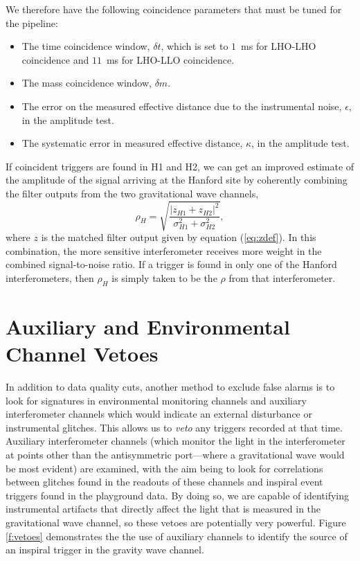We therefore have the following coincidence parameters that must be tuned for
the pipeline:
\begin{itemize}
\item The time coincidence window, $\delta t$, which is set to $1$~ms for
LHO-LHO coincidence and $11$~ms for LHO-LLO coincidence.

\item The mass coincidence window, $\delta m$.

\item The error on the measured effective distance due to the instrumental
noise, $\epsilon$, in the amplitude test.

\item The systematic error in measured effective distance, $\kappa$, in the
amplitude test.
\end{itemize}

If coincident triggers are found in H1 and H2, we can get an improved estimate
of the amplitude of the signal arriving at the Hanford site by coherently
combining the filter outputs from the two gravitational wave channels, 
\begin{equation}
\rho_H = \sqrt{ \frac{|z_{H1} + z_{H2}|^2}{\sigma_{H1}^2 +
     \sigma_{H2}^2} },
\label{eq:rhoH}
\end{equation}
where $z$ is the matched filter output given by equation (\ref{eq:zdef}).
In this combination, the more sensitive interferometer receives more weight in
the combined signal-to-noise ratio.  If a trigger is found in only one of the
Hanford interferometers, then $\rho_H$ is simply taken to be the $\rho$ from
that interferometer.


\section{Auxiliary and Environmental Channel Vetoes}
\label{s:vetoes}

In addition to data quality cuts, another method to exclude false alarms is to
look for signatures in environmental monitoring channels and auxiliary
interferometer channels which would indicate an external disturbance or
instrumental glitches. This allows us to {\it veto} any triggers recorded at
that time.  Auxiliary interferometer channels (which monitor the light in the
interferometer at points other than the antisymmetric port---where a
gravitational wave would be most evident) are examined, with the aim being to
look for correlations between glitches found in the readouts of these channels
and inspiral event triggers found in the playground data.  By doing so, we are
capable of identifying instrumental artifacts that directly affect the light
that is measured in the gravitational wave channel, so these vetoes are
potentially very powerful. Figure \ref{f:vetoes} demonstrates the the use of
auxiliary channels to identify the source of an inspiral trigger in the
gravity wave channel.

